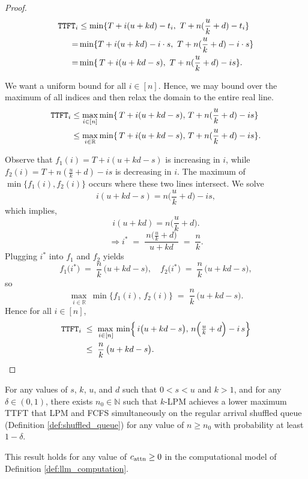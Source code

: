 \begin{proof}
\begin{align*}
    \texttt{TTFT}_i &\leq \min\{T + i(u+kd) - t_i, ~ T +  n(\frac{u}{k} + d) - t_i \} \\
    = &\min\{T + i(u+kd) - i \cdot s, ~ T + n(\frac{u}{k} + d) - i \cdot s \} \\
    = &\min\{\,T + i(u + kd - s), ~ T + n(\frac{u}{k} + d) - i s\}.
\end{align*}

We want a uniform bound for all \(i \in [n]\). Hence, we may bound over the maximum of all indices and then relax the domain to the entire real line.
\begin{align*}
\texttt{TTFT}_i &\leq \max_{i \in [n]} \min\{\,T+i(u + kd - s),\, T+ n(\frac{u}{k} + d) - i s\} \\
&\leq
\max_{i \in \mathbb{R}}
\min\{\,T+ i(u + kd - s),\,T+n(\frac{u}{k} + d) - i s\}.    
\end{align*}


Observe that 
\(f_1(i) = T + i(u + kd - s)\) is increasing in \(i\), 
while 
\(f_2(i) = T + n(\frac{u}{k} + d) - i s\) is decreasing in \(i\). 
The maximum of \(\min\{f_1(i), f_2(i)\}\) occurs where these two lines intersect. We solve 
$$
i(u + kd - s) = n\!\bigl(\frac{u}{k} + d\bigr) - i s,
$$
which implies,
$$
i(u + kd) = n\!\bigl(\frac{u}{k} + d\bigr).
$$
\[
\Rightarrow i^*
\;=\;
\frac{\,n\bigl(\frac{u}{k} + d\bigr)\,}{\,u + kd\,}
\;=\;
\frac{n}{k}.
\]
Plugging \(i^*\) into \(f_1\) and \(f_2\) yields
\[
f_1\bigl(i^*\bigr)
\;=\;
\frac{n}{k}\,\bigl(u + kd - s\bigr),
\quad
f_2\bigl(i^*\bigr)
\;=\;
\frac{n}{k}\,\bigl(u + kd - s\bigr),
\]
so
\[
\max_{\,i\in \mathbb{R}}\,
\min\{f_1(i),\,f_2(i)\}
\;=\;
\frac{n}{k}\,\bigl(u + kd - s\bigr).
\]
Hence for all \(i\in [n]\),
\begin{align*}
\texttt{TTFT}_i
\;&\le\;
\max_{\,i \in [n]}\,
\min\Bigl\{\,i\bigl(u + kd - s\bigr),\,n\Bigl(\tfrac{u}{k}+d\Bigr) - i\,s \Bigr\} \\
\;&\leq\;
\frac{n}{k}\,\bigl(u + kd - s\bigr).
\end{align*}

    
\end{proof}


\begin{corollary}\label{corollary:klpm_better}
    For any values of $s$, $k$, $u$, and $d$ such that $0 < s < u$ and $k > 1$, and for any $\delta \in (0,1)$, there exists $n_0 \in \mathbb{N}$ such that $k$-LPM achieves a lower maximum TTFT that LPM and FCFS simultaneously on the regular arrival shuffled queue (Definition \ref{def:shuffled_queue}) for any value of $n \geq n_0$ with probability at least $1 - \delta$.

    This result holds for any value of $c_{\mathrm{attn}} \geq 0$ in the computational model of Definition \ref{def:llm_computation}.
\end{corollary}


